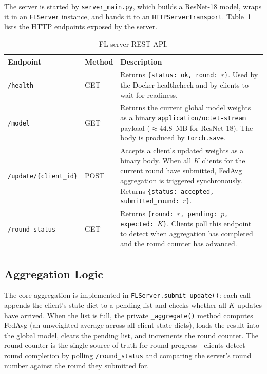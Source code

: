 \documentclass[12pt,a4paper]{report}
\begin{document}
The server is started by \texttt{server\_main.py}, which builds a
ResNet-18 model, wraps it in an \texttt{FLServer} instance, and hands
it to an \texttt{HTTPServerTransport}.  Table~\ref{tab:api} lists the
HTTP endpoints exposed by the server.

\begin{table}[H]
\centering
\caption{FL server REST API.}
\label{tab:api}
\begin{tabular}{llp{8cm}}
\toprule
Endpoint & Method & Description \\
\midrule
\texttt{/health} & GET &
  Returns \texttt{\{status: ok, round: $r$\}}.  Used by the Docker
  healthcheck and by clients to wait for readiness. \\
\texttt{/model} & GET &
  Returns the current global model weights as a binary
  \texttt{application/octet-stream} payload ($\approx 44.8$~MB for
  ResNet-18).  The body is produced by \texttt{torch.save}. \\
\texttt{/update/\{client\_id\}} & POST &
  Accepts a client's updated weights as a binary body.  When all $K$
  clients for the current round have submitted, FedAvg aggregation is
  triggered synchronously.  Returns \texttt{\{status: accepted,
  submitted\_round: $r$\}}. \\
\texttt{/round\_status} & GET &
  Returns \texttt{\{round: $r$, pending: $p$, expected: $K$\}}.
  Clients poll this endpoint to detect when aggregation has completed
  and the round counter has advanced. \\
\bottomrule
\end{tabular}
\end{table}

\subsection{Aggregation Logic}

The core aggregation is implemented in \texttt{FLServer.submit\_update()}:
each call appends the client's state dict to a pending list and checks
whether all $K$ updates have arrived.  When the list is full, the
private \texttt{\_aggregate()} method computes FedAvg (an unweighted
average across all client state dicts), loads the result into the global
model, clears the pending list, and increments the round counter.  The
round counter is the single source of truth for round progress---clients
detect round completion by polling \texttt{/round\_status} and comparing
the server's round number against the round they submitted for.
\end{document}
